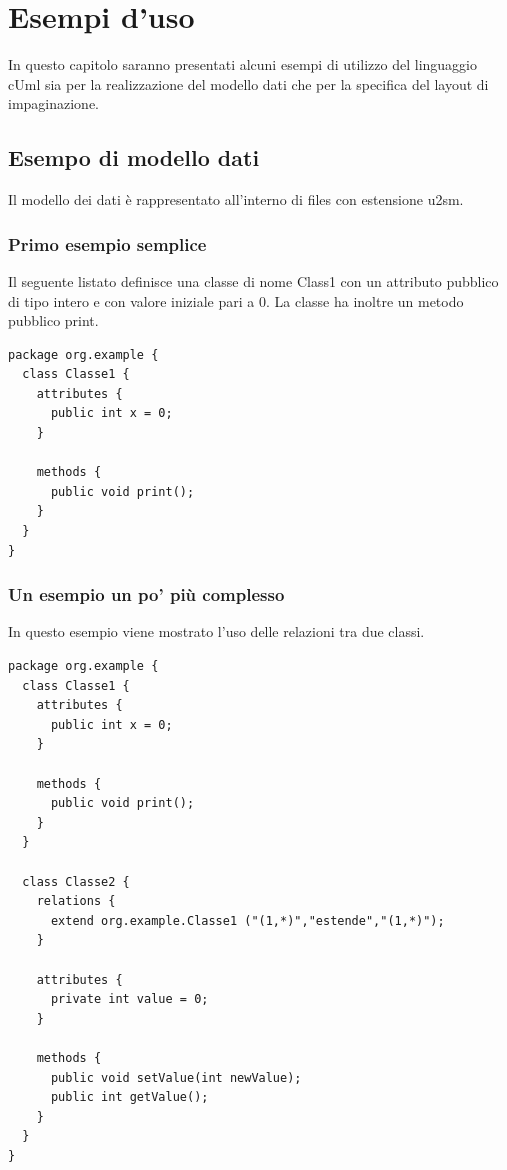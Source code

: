 \chapter{Esempi d'uso}

In questo capitolo saranno presentati alcuni esempi di utilizzo del linguaggio
cUml sia per la realizzazione del modello dati che per la specifica del layout
di impaginazione.

\section{Esempo di modello dati}
Il modello dei dati è rappresentato all'interno di files con estensione u2sm.

\subsection{Primo esempio semplice}
Il seguente listato definisce una classe di nome Class1 con un attributo
pubblico di tipo intero e con valore iniziale pari a 0. La classe ha inoltre un
metodo pubblico print.
\begin{lstlisting}[language=model, caption={Semplice esempio di modello}, style={model}]
package org.example {
  class Classe1 {
    attributes {
      public int x = 0;
    }
  
    methods {
      public void print();
    }
  }
}
\end{lstlisting}

\subsection{Un esempio un po' più complesso}
In questo esempio viene mostrato l'uso delle relazioni tra due classi.

\begin{lstlisting}[language=model, caption={Un esempio un po' più complesso}, style={model}, label=model_complex]
package org.example {
  class Classe1 {
    attributes {
      public int x = 0;
    }

    methods {
      public void print();
    }
  }

  class Classe2 {
    relations {
      extend org.example.Classe1 ("(1,*)","estende","(1,*)");
    }

    attributes {
      private int value = 0;
    }

    methods {
      public void setValue(int newValue);
      public int getValue();
    }
  }
}
\end{lstlisting}


